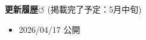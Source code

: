 \documentclass[a4paper,11pt]{jsarticle}
\begin{document}
\tableofcontents
\bigskip
\noindent\textbf{更新履歴$\circlearrowleft$} {\scriptsize(掲載完了予定：5月中旬)}
\begin{itemize}
    \item 2026/04/17 公開
\end{itemize}
\newpage

\title{}
\author{}
\date{}
\maketitle


\newpage

\newpage

\newpage

\newpage

\newpage

\newpage

\end{document}
